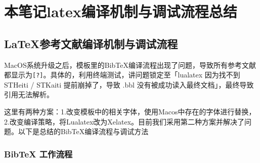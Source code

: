 \chapter{本笔记latex编译机制与调试流程总结}
\section{LaTeX参考文献编译机制与调试流程}
MacOS系统升级之后，模板里的BibTeX编译流程出现了问题，导致所有参考文献都显示为\verb|[?]|。具体的，利用终端测试，讲问题锁定至「lualatex 因为找不到 STHeiti / STKaiti 提前崩掉了，导致 .bbl 没有被成功读入最终文档」，最终导致引用无法解析。

这里有两种方案：1.改变模板中的相关字体，使用Macos中存在的字体进行替换，2.改变编译策略，将Lualatex改为Xelatex。目前我们采用第二种方案并解决了问题。以下是总结的BibTeX编译流程与调试方法


\subsection{BibTeX 工作流程}

